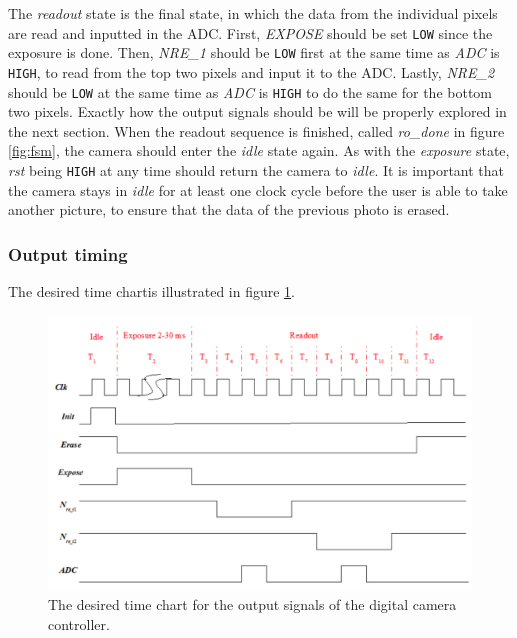 The \emph{readout} state is the final state, in which the data from the individual pixels are read and inputted in the ADC. First, \emph{EXPOSE} should be set \verb|LOW| since the exposure is done. Then, \emph{NRE\_1} should be \verb|LOW| first at the same time as \emph{ADC} is \verb|HIGH|, to read from the top two pixels and input it to the ADC. Lastly, \emph{NRE\_2} should be \verb|LOW| at the same time as \emph{ADC} is \verb|HIGH| to do the same for the bottom two pixels. Exactly how the output signals should be will be properly explored in the next section. When the readout sequence is finished, called \emph{ro\_done} in figure \ref{fig:fsm}, the camera should enter the \emph{idle} state again. As with the \emph{exposure} state, \emph{rst} being \verb|HIGH| at any time should return the camera to \emph{idle}. It is important that the camera stays in \emph{idle} for at least one clock cycle before the user is able to take another picture, to ensure that the data of the previous photo is erased.

\subsubsection{Output timing}

The desired time chartis illustrated in figure \ref{fig:timechart}.

\begin{figure}[H]
    \centering
    \includegraphics[width=\textwidth]{graphs/time_chart.png}
    \caption{The desired time chart for the output signals of the digital camera controller.}
    \label{fig:timechart}
\end{figure}

